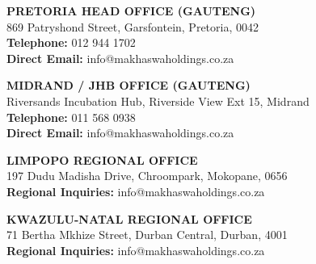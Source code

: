 \documentclass[a4paper,11pt]{article}
\begin{document}
\noindent
\begin{minipage}[t]{0.485\textwidth}
    \begin{tcolorbox}[
        enhanced, colback=mhnavy2, colframe=mhblue!40, boxrule=0.8pt, arc=4pt,
        left=9pt, right=9pt, top=9pt, bottom=9pt
    ]
        {\bfseries\color{white}\small PRETORIA HEAD OFFICE (GAUTENG)}\\[0.15cm]
        \fontsize{8pt}{11.5pt}\selectfont\color{white!90}
        869 Patryshond Street, Garsfontein, Pretoria, 0042\\
        \textbf{Telephone:} 012 944 1702\\
        \textbf{Direct Email:} info@makhaswaholdings.co.za
    \end{tcolorbox}
\end{minipage}
\hfill
\begin{minipage}[t]{0.485\textwidth}
    \begin{tcolorbox}[
        enhanced, colback=mhnavy2, colframe=mhblue!40, boxrule=0.8pt, arc=4pt,
        left=9pt, right=9pt, top=9pt, bottom=9pt
    ]
        {\bfseries\color{white}\small MIDRAND / JHB OFFICE (GAUTENG)}\\[0.15cm]
        \fontsize{8pt}{11.5pt}\selectfont\color{white!90}
        Riversands Incubation Hub, Riverside View Ext 15, Midrand\\
        \textbf{Telephone:} 011 568 0938\\
        \textbf{Direct Email:} info@makhaswaholdings.co.za
    \end{tcolorbox}
\end{minipage}

\vspace{0.3cm}

\noindent
\begin{minipage}[t]{0.485\textwidth}
    \begin{tcolorbox}[
        enhanced, colback=mhnavy2, colframe=mhblue!40, boxrule=0.8pt, arc=4pt,
        left=9pt, right=9pt, top=9pt, bottom=9pt
    ]
        {\bfseries\color{white}\small LIMPOPO REGIONAL OFFICE}\\[0.15cm]
        \fontsize{8pt}{11.5pt}\selectfont\color{white!90}
        197 Dudu Madisha Drive, Chroompark, Mokopane, 0656\\
        \textbf{Regional Inquiries:} info@makhaswaholdings.co.za
    \end{tcolorbox}
\end{minipage}
\hfill
\begin{minipage}[t]{0.485\textwidth}
    \begin{tcolorbox}[
        enhanced, colback=mhnavy2, colframe=mhblue!40, boxrule=0.8pt, arc=4pt,
        left=9pt, right=9pt, top=9pt, bottom=9pt
    ]
        {\bfseries\color{white}\small KWAZULU-NATAL REGIONAL OFFICE}\\[0.15cm]
        \fontsize{8pt}{11.5pt}\selectfont\color{white!90}
        71 Bertha Mkhize Street, Durban Central, Durban, 4001\\
        \textbf{Regional Inquiries:} info@makhaswaholdings.co.za
    \end{tcolorbox}
\end{minipage}
\end{document}
